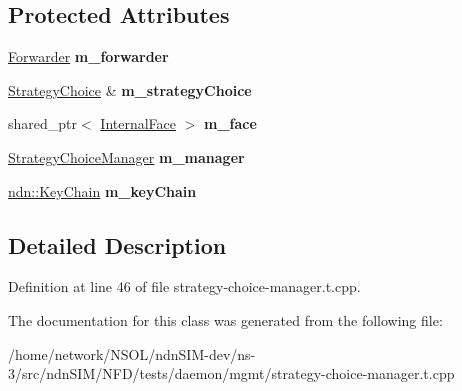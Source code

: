 \subsection*{Protected Attributes}
\begin{DoxyCompactItemize}
\item 
\hyperlink{classnfd_1_1Forwarder}{Forwarder} {\bfseries m\+\_\+forwarder}\hypertarget{classnfd_1_1tests_1_1StrategyChoiceManagerFixture_a01d739d929a2531919d71d71fba6b1b6}{}\label{classnfd_1_1tests_1_1StrategyChoiceManagerFixture_a01d739d929a2531919d71d71fba6b1b6}

\item 
\hyperlink{classnfd_1_1StrategyChoice}{Strategy\+Choice} \& {\bfseries m\+\_\+strategy\+Choice}\hypertarget{classnfd_1_1tests_1_1StrategyChoiceManagerFixture_a7a45da465e68a80829bd855d12403e3a}{}\label{classnfd_1_1tests_1_1StrategyChoiceManagerFixture_a7a45da465e68a80829bd855d12403e3a}

\item 
shared\+\_\+ptr$<$ \hyperlink{classnfd_1_1InternalFace}{Internal\+Face} $>$ {\bfseries m\+\_\+face}\hypertarget{classnfd_1_1tests_1_1StrategyChoiceManagerFixture_a827be50cd2114b222237217ca304bf3b}{}\label{classnfd_1_1tests_1_1StrategyChoiceManagerFixture_a827be50cd2114b222237217ca304bf3b}

\item 
\hyperlink{classnfd_1_1StrategyChoiceManager}{Strategy\+Choice\+Manager} {\bfseries m\+\_\+manager}\hypertarget{classnfd_1_1tests_1_1StrategyChoiceManagerFixture_a79297e710ded18cf952bc32a1c2f1b78}{}\label{classnfd_1_1tests_1_1StrategyChoiceManagerFixture_a79297e710ded18cf952bc32a1c2f1b78}

\item 
\hyperlink{classndn_1_1security_1_1KeyChain}{ndn\+::\+Key\+Chain} {\bfseries m\+\_\+key\+Chain}\hypertarget{classnfd_1_1tests_1_1StrategyChoiceManagerFixture_aa0c7d6e142b67b513c76ac68a79f7650}{}\label{classnfd_1_1tests_1_1StrategyChoiceManagerFixture_aa0c7d6e142b67b513c76ac68a79f7650}

\end{DoxyCompactItemize}


\subsection{Detailed Description}


Definition at line 46 of file strategy-\/choice-\/manager.\+t.\+cpp.



The documentation for this class was generated from the following file\+:\begin{DoxyCompactItemize}
\item 
/home/network/\+N\+S\+O\+L/ndn\+S\+I\+M-\/dev/ns-\/3/src/ndn\+S\+I\+M/\+N\+F\+D/tests/daemon/mgmt/strategy-\/choice-\/manager.\+t.\+cpp\end{DoxyCompactItemize}
